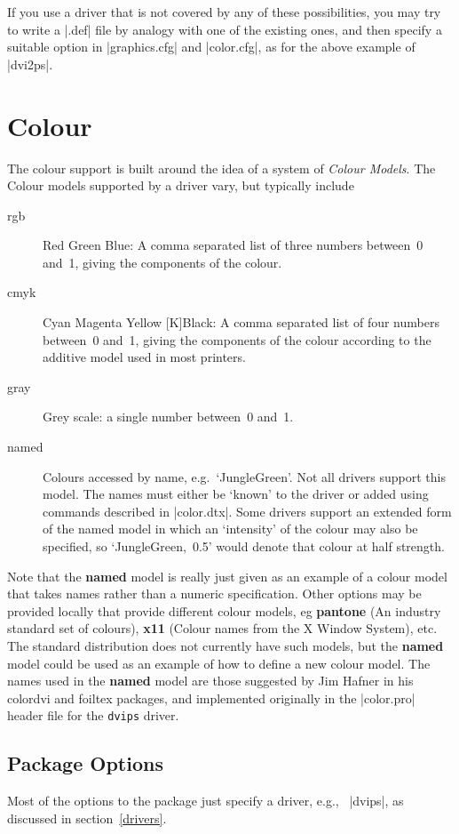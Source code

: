 If you use a driver that is not covered by any of these possibilities,
you may try to write a |.def| file by analogy with one of the existing
ones, and then specify a suitable option in |graphics.cfg| and
|color.cfg|, as for the above example of |dvi2ps|.

\section{Colour}
The colour support is built around the idea of a system of
\emph{Colour Models}. The Colour models supported by a driver vary,
but typically include
\begin{description}
\item[rgb] Red Green Blue: A comma separated list of three numbers
  between~0 and~1, giving the components of the colour.
\item[cmyk] Cyan Magenta Yellow [K]Black:  A comma separated list of
  four numbers between~0 and~1, giving the components of the colour
  according to the additive model used in most printers.
\item[gray] Grey scale: a single number between~0 and~1.
\item[named] Colours accessed by name, e.g.\ `JungleGreen'. Not all
  drivers support this model. The names must either be `known' to the
  driver or added using commands described in |color.dtx|. Some drivers
  support an extended form of the named model in which an `intensity' of
  the colour may also be specified, so `\mbox{JungleGreen, 0.5}' would
  denote that colour at half strength.
\end{description}
Note that the \textbf{named} model is really just given as an example
of a colour model that takes names rather than a numeric specification.
Other options may be provided locally that provide different colour
models, eg \textbf{pantone} (An industry standard set of colours),
\textbf{x11} (Colour names from the X Window System), etc. The
standard distribution does not currently have such models, but the
\textbf{named} model could be used as an example of how to define a new
colour model. The names used in the \textbf{named} model are those 
suggested by Jim Hafner in his \textsf{colordvi} and \textsf{foiltex}
packages, and implemented originally in the |color.pro| header file for
the \texttt{dvips} driver.

\subsection{Package Options}
Most of the options to the  package just specify a
driver, e.g., \ |dvips|, as discussed in section~\ref{drivers}.

